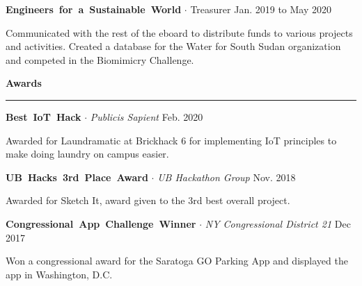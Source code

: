 \documentclass{article}
\newcommand{\rSection}[1] {
  \textcolor{header-blue} {
    \textbf{{\fontsize{0.5cm}{0.45cm}\selectfont \hbox{#1}}} \\
    \rule{0.30\textwidth}{0.1cm}
  }
}
\newcommand{\rSubSubSection}[1] {
  \textbf{{\fontsize{0.35cm}{0.45cm}\selectfont \hbox{#1}}}
}
\begin{document}
\rSubSubSection{Engineers for a Sustainable World} $ \cdot $ Treasurer \hfill Jan. 2019 to May 2020 \par
Communicated with the rest of the eboard to distribute funds to various projects and activities. Created a database for the Water
for South Sudan organization and competed in the Biomimicry Challenge. \par

\rSection{Awards} \par

\rSubSubSection{Best IoT Hack} $ \cdot $ \textit{Publicis Sapient} \hfill Feb. 2020 \par
Awarded for Laundramatic at Brickhack 6 for implementing IoT principles to make doing laundry on campus easier. \par

\rSubSubSection{UB Hacks 3rd Place Award} $ \cdot $ \textit{UB Hackathon Group} \hfill Nov. 2018 \par
Awarded for Sketch It, award given to the 3rd best overall project. \par \bigskip

\rSubSubSection{Congressional App Challenge Winner} $ \cdot $ \textit{NY Congressional District 21} \hfill Dec 2017 \par
Won a congressional award for the Saratoga GO Parking App and displayed the app in Washington, D.C.
\end{document}
